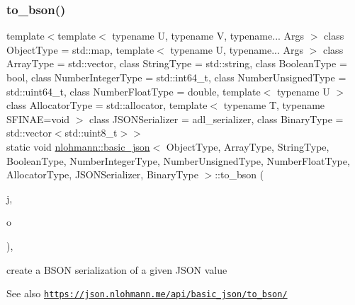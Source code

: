 \subsubsection{\texorpdfstring{to\+\_\+bson()}{to\_bson()}\hspace{0.1cm}{\footnotesize\ttfamily [3/3]}}
{\footnotesize\ttfamily template$<$template$<$ typename U, typename V, typename... Args $>$ class Object\+Type = std\+::map, template$<$ typename U, typename... Args $>$ class Array\+Type = std\+::vector, class String\+Type  = std\+::string, class Boolean\+Type  = bool, class Number\+Integer\+Type  = std\+::int64\+\_\+t, class Number\+Unsigned\+Type  = std\+::uint64\+\_\+t, class Number\+Float\+Type  = double, template$<$ typename U $>$ class Allocator\+Type = std\+::allocator, template$<$ typename T, typename S\+F\+I\+N\+A\+E=void $>$ class J\+S\+O\+N\+Serializer = adl\+\_\+serializer, class Binary\+Type  = std\+::vector$<$std\+::uint8\+\_\+t$>$$>$ \\
static void \hyperlink{classnlohmann_1_1basic__json}{nlohmann\+::basic\+\_\+json}$<$ Object\+Type, Array\+Type, String\+Type, Boolean\+Type, Number\+Integer\+Type, Number\+Unsigned\+Type, Number\+Float\+Type, Allocator\+Type, J\+S\+O\+N\+Serializer, Binary\+Type $>$\+::to\+\_\+bson (\begin{DoxyParamCaption}\item[{const \hyperlink{classnlohmann_1_1basic__json}{basic\+\_\+json}$<$ Object\+Type, Array\+Type, String\+Type, Boolean\+Type, Number\+Integer\+Type, Number\+Unsigned\+Type, Number\+Float\+Type, Allocator\+Type, J\+S\+O\+N\+Serializer, Binary\+Type $>$ \&}]{j,  }\item[{\hyperlink{classnlohmann_1_1detail_1_1output__adapter}{detail\+::output\+\_\+adapter}$<$ char $>$}]{o }\end{DoxyParamCaption})\hspace{0.3cm}{\ttfamily [inline]}, {\ttfamily [static]}}



create a B\+S\+ON serialization of a given J\+S\+ON value 

\begin{DoxySeeAlso}{See also}
\href{https://json.nlohmann.me/api/basic_json/to_bson/}{\tt https\+://json.\+nlohmann.\+me/api/basic\+\_\+json/to\+\_\+bson/} 
\end{DoxySeeAlso}
\mbox{\label{classnlohmann_1_1basic__json_a7ddb186b25dd9b1da672a3d5f3defbf9}} 
